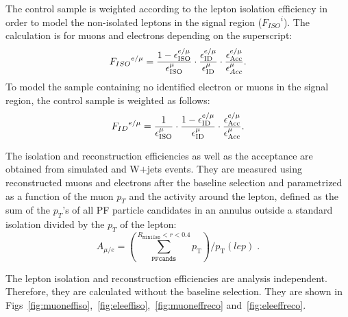 The control sample is weighted according to the lepton isolation efficiency in order to model the non-isolated leptons in the signal region (${F_{ISO}}^{i}$). 
The calculation is for muons and electrons depending on the superscript:
\begin{equation}
{F_{ISO}}^{e/\mu} =  \frac{1-\epsilon_{\rm ISO}^{e/\mu}}{\epsilon_{\rm ISO}^{\mu}} \cdot \frac{\epsilon^{e/\mu}_{\rm ID}}{\epsilon^{\mu}_{\rm ID}} \cdot \frac{\epsilon^{e/\mu}_{\rm Acc}}{\epsilon^{\mu}_{Acc}}.
\label{eq:isolation}
\end{equation}
To model the sample containing no identified electron or muons in the signal region, the control sample is weighted as follows:
\begin{equation}
{F_{ID}}^{e/\mu} = \frac{1}{\epsilon_{\rm ISO}^{\mu}}\cdot \frac{1-\epsilon_{\rm ID}^{e/\mu}}{\epsilon_{\rm ID}^{\mu}}  \cdot \frac{\epsilon^{e/\mu}_{\rm Acc}}{\epsilon^{\mu}_{\rm Acc}}.
\label{eq:id}
\end{equation}

The isolation and reconstruction efficiencies as well as the acceptance are obtained from simulated \ttbar and W$+$jets events. They are measured using reconstructed muons and electrons after the baseline selection and parametrized as a function of the muon $p_T$ and the activity around the lepton, defined as the sum of the $p_{T}$'s of all PF particle candidates in an annulus outside a standard isolation divided by the $p_T$ of the lepton:
\begin{equation}
\textit{$A_{\mu/e}$}=\left(\sum^{R_\texttt{miniIso}<r<0.4}_\texttt{PFcands} p_\text{T}\right) / p_\text{T}(lep) \; .
\label{eq:activity}
\end{equation}

The lepton isolation and reconstruction efficiencies are analysis independent. Therefore, they are calculated without the baseline selection. They are shown in Figs~\ref{fig:muoneffiso},~\ref{fig:eleeffiso},~\ref{fig:muoneffreco} and~\ref{fig:eleeffreco}.

